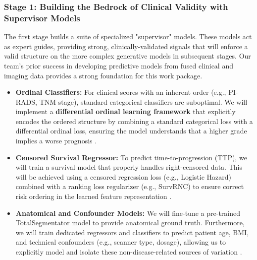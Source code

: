 \documentclass[11pt, a4paper]{article}
\begin{document}
\subsubsection{Stage 1: Building the Bedrock of Clinical Validity with Supervisor Models}
The first stage builds a suite of specialized "supervisor" models. These models act as expert guides, providing strong, clinically-validated signals that will enforce a valid structure on the more complex generative models in subsequent stages. Our team's prior success in developing predictive models from fused clinical and imaging data provides a strong foundation for this work package.
\begin{itemize}
    \item \textbf{Ordinal Classifiers:} For clinical scores with an inherent order (e.g., PI-RADS, TNM stage), standard categorical classifiers are suboptimal. We will implement a \textbf{differential ordinal learning framework} that explicitly encodes the ordered structure by combining a standard categorical loss with a differential ordinal loss, ensuring the model understands that a higher grade implies a worse prognosis \cite{LeeByeon2025, GrisiKartasalo2025}.
    \item \textbf{Censored Survival Regressor:} To predict time-to-progression (TTP), we will train a survival model that properly handles right-censored data. This will be achieved using a censored regression loss (e.g., Logistic Hazard) combined with a ranking loss regularizer (e.g., SurvRNC) to ensure correct risk ordering in the learned feature representation \cite{GaoLi2019, RivailVogl2023, ShahinZhao2023}.
    \item \textbf{Anatomical and Confounder Models:} We will fine-tune a pre-trained TotalSegmentator model to provide anatomical ground truth. Furthermore, we will train dedicated regressors and classifiers to predict patient age, BMI, and technical confounders (e.g., scanner type, dosage), allowing us to explicitly model and isolate these non-disease-related sources of variation \cite{PuglisiAlexander2025, ZhangHager2025}.
\end{itemize}
\end{document}
